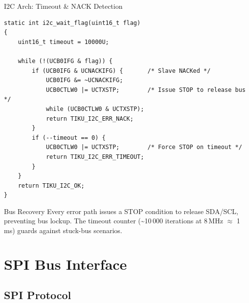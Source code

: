 \documentclass[aspectratio=169, 10pt]{beamer}
\begin{document}
\begin{frame}[fragile]{I2C Arch: Timeout \& NACK Detection}
\begin{lstlisting}[style=cstyle, title={Timeout-guarded flag wait with NACK detection}]
static int i2c_wait_flag(uint16_t flag)
{
    uint16_t timeout = 10000U;

    while (!(UCB0IFG & flag)) {
        if (UCB0IFG & UCNACKIFG) {       /* Slave NACKed */
            UCB0IFG &= ~UCNACKIFG;
            UCB0CTLW0 |= UCTXSTP;        /* Issue STOP to release bus */
            while (UCB0CTLW0 & UCTXSTP);
            return TIKU_I2C_ERR_NACK;
        }
        if (--timeout == 0) {
            UCB0CTLW0 |= UCTXSTP;        /* Force STOP on timeout */
            return TIKU_I2C_ERR_TIMEOUT;
        }
    }
    return TIKU_I2C_OK;
}
\end{lstlisting}

\vspace{0.3em}
\begin{block}{Bus Recovery}
Every error path issues a STOP condition to release SDA/SCL,
preventing bus lockup. The timeout counter (\textasciitilde10\,000 iterations
at 8\,MHz $\approx$ 1\,ms) guards against stuck-bus scenarios.
\end{block}
\end{frame}

\section{SPI Bus Interface}

\subsection{SPI Protocol}
\end{document}
